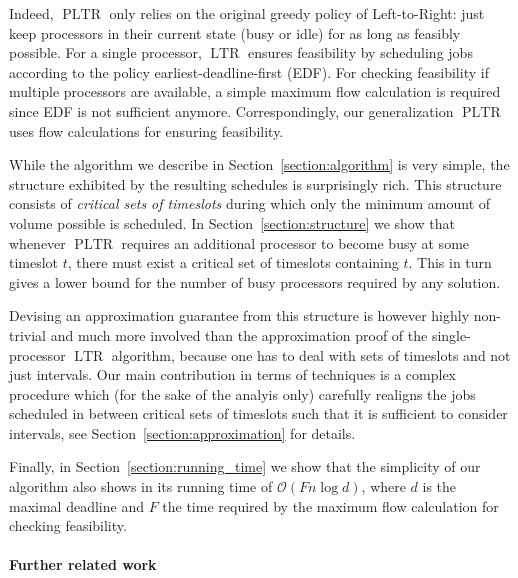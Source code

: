 \documentclass[a4paper]{article}
\DeclareMathOperator{\PLTR}{PLTR}
\DeclareMathOperator{\LTR}{LTR}
\begin{document}
Indeed, $\PLTR$ only relies on the original greedy policy of Left-to-Right: just keep processors in their current state (busy or idle) for as long as feasibly possible.
For a single processor, $\LTR$ ensures feasibility by scheduling jobs according to the policy earliest-deadline-first (EDF).
For checking feasibility if multiple processors are available, a simple maximum flow calculation is required since EDF is not sufficient anymore.
Correspondingly, our generalization $\PLTR$ uses flow calculations for ensuring feasibility.

While the algorithm we describe in Section~\ref{section:algorithm} is very simple, the structure exhibited by the resulting schedules is surprisingly rich.
This structure consists of \textit{critical sets of timeslots} during which only the minimum amount of volume possible is scheduled.
In Section~\ref{section:structure} we show that whenever $\PLTR$ requires an additional processor to become busy at some timeslot $t$, there must exist a critical set of timeslots containing $t$.
This in turn gives a lower bound for the number of busy processors required by any solution.

Devising an approximation guarantee from this structure is however highly non-trivial and much more involved than the approximation proof of the single-processor $\LTR$ algorithm, because one has to deal with sets of timeslots and not just intervals.
Our main contribution in terms of techniques is a complex procedure which (for the sake of the analyis only) carefully realigns the jobs scheduled in between critical sets of timeslots such that it is sufficient to consider intervals, see Section~\ref{section:approximation} for details.

Finally, in Section~\ref{section:running_time} we show that the simplicity of our algorithm also shows in its running time of $\mathcal{O}(F n \log d)$, where $d$ is the maximal deadline and $F$ the time required by the maximum flow calculation for checking feasibility.

\paragraph{Further related work}
\end{document}
